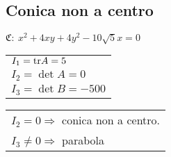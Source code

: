 \subsection{Conica non a centro}
$\mathfrak{C}:\ x^2+4xy+4y^2-10\sqrt{5}x=0$

\begin{tabular}{l}
	$I_1 = \mathrm{tr} A = 5$ \\
	$I_2 = \det A = 0$ \\ 
	$I_3 = \det B = -500$
\end{tabular}
\begin{tabular}{l}
	$I_2 = 0 \Rightarrow$ conica non a centro. \\
	$I_3 \neq 0 \Rightarrow$ parabola	
\end{tabular}

